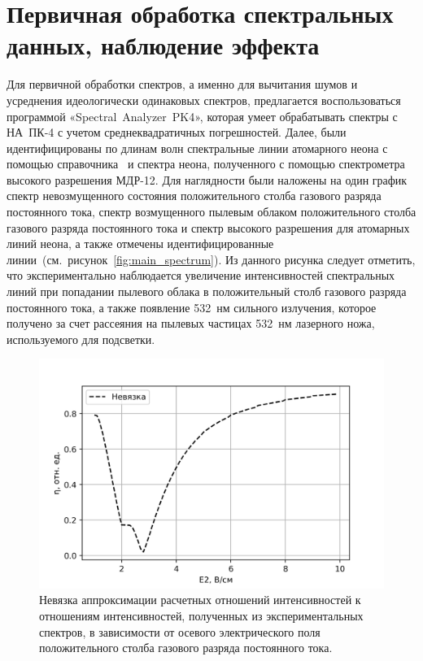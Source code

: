 \section{Первичная обработка спектральных данных, наблюдение эффекта}

Для первичной обработки спектров, а именно для вычитания шумов и усреднения идеологически одинаковых спектров,
предлагается воспользоваться программой «Spectral~Analyzer~PK4», которая умеет обрабатывать спектры с НА~ПК-4 с учетом
среднеквадратичных погрешностей. Далее, были идентифицированы по длинам волн спектральные линии атомарного неона с помощью справочника~
\cite{Stritanov1966} и спектра неона, полученного с помощью спектрометра высокого разрешения МДР-12.
Для наглядности были наложены на один график
спектр невозмущенного состояния положительного столба газового разряда постоянного тока,
спектр возмущенного пылевым облаком положительного столба газового разряда постоянного тока и
спектр высокого разрешения для атомарных линий неона, а также отмечены идентифицированные линии~(см.~рисунок~\ref{fig:main_spectrum}).
Из данного рисунка следует отметить, что экспериментально наблюдается увеличение интенсивностей спектральных
линий при попадании пылевого облака в положительный столб газового разряда постоянного тока,
а также появление 532~нм сильного излучения, которое получено за счет рассеяния на пылевых частицах
532~нм лазерного ножа, используемого для подсветки.
\begin{figure}[t]
  \centering
  \includegraphics[width=16cm]{figures/discrepancy}
  \caption{Невязка аппроксимации расчетных отношений интенсивностей к отношениям интенсивностей, полученных из
  экспериментальных спектров, в зависимости от осевого электрического поля положительного столба газового разряда постоянного тока.}
  \label{fig:discrepancy}
\end{figure}

